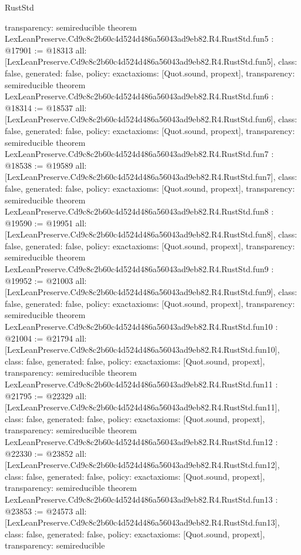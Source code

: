 \begin{lexlean}{RustStd}
\begin{coremodule}
{  transparency: semireducible
}
theorem LexLeanPreserve.Cd9c8c2b60c4d524d486a56043ad9eb82.R4.RustStd.fun5 : @17901 := @18313 {
  all: [LexLeanPreserve.Cd9c8c2b60c4d524d486a56043ad9eb82.R4.RustStd.fun5],
  class: false,
  generated: false,
  policy: exact{axioms: [Quot.sound, propext]},
  transparency: semireducible
}
theorem LexLeanPreserve.Cd9c8c2b60c4d524d486a56043ad9eb82.R4.RustStd.fun6 : @18314 := @18537 {
  all: [LexLeanPreserve.Cd9c8c2b60c4d524d486a56043ad9eb82.R4.RustStd.fun6],
  class: false,
  generated: false,
  policy: exact{axioms: [Quot.sound, propext]},
  transparency: semireducible
}
theorem LexLeanPreserve.Cd9c8c2b60c4d524d486a56043ad9eb82.R4.RustStd.fun7 : @18538 := @19589 {
  all: [LexLeanPreserve.Cd9c8c2b60c4d524d486a56043ad9eb82.R4.RustStd.fun7],
  class: false,
  generated: false,
  policy: exact{axioms: [Quot.sound, propext]},
  transparency: semireducible
}
theorem LexLeanPreserve.Cd9c8c2b60c4d524d486a56043ad9eb82.R4.RustStd.fun8 : @19590 := @19951 {
  all: [LexLeanPreserve.Cd9c8c2b60c4d524d486a56043ad9eb82.R4.RustStd.fun8],
  class: false,
  generated: false,
  policy: exact{axioms: [Quot.sound, propext]},
  transparency: semireducible
}
theorem LexLeanPreserve.Cd9c8c2b60c4d524d486a56043ad9eb82.R4.RustStd.fun9 : @19952 := @21003 {
  all: [LexLeanPreserve.Cd9c8c2b60c4d524d486a56043ad9eb82.R4.RustStd.fun9],
  class: false,
  generated: false,
  policy: exact{axioms: [Quot.sound, propext]},
  transparency: semireducible
}
theorem LexLeanPreserve.Cd9c8c2b60c4d524d486a56043ad9eb82.R4.RustStd.fun10 : @21004 := @21794 {
  all: [LexLeanPreserve.Cd9c8c2b60c4d524d486a56043ad9eb82.R4.RustStd.fun10],
  class: false,
  generated: false,
  policy: exact{axioms: [Quot.sound, propext]},
  transparency: semireducible
}
theorem LexLeanPreserve.Cd9c8c2b60c4d524d486a56043ad9eb82.R4.RustStd.fun11 : @21795 := @22329 {
  all: [LexLeanPreserve.Cd9c8c2b60c4d524d486a56043ad9eb82.R4.RustStd.fun11],
  class: false,
  generated: false,
  policy: exact{axioms: [Quot.sound, propext]},
  transparency: semireducible
}
theorem LexLeanPreserve.Cd9c8c2b60c4d524d486a56043ad9eb82.R4.RustStd.fun12 : @22330 := @23852 {
  all: [LexLeanPreserve.Cd9c8c2b60c4d524d486a56043ad9eb82.R4.RustStd.fun12],
  class: false,
  generated: false,
  policy: exact{axioms: [Quot.sound, propext]},
  transparency: semireducible
}
theorem LexLeanPreserve.Cd9c8c2b60c4d524d486a56043ad9eb82.R4.RustStd.fun13 : @23853 := @24573 {
  all: [LexLeanPreserve.Cd9c8c2b60c4d524d486a56043ad9eb82.R4.RustStd.fun13],
  class: false,
  generated: false,
  policy: exact{axioms: [Quot.sound, propext]},
  transparency: semireducible
}
\end{coremodule}
\end{lexlean}
